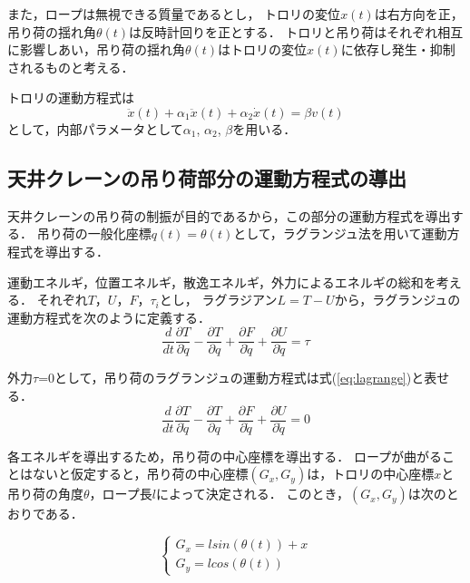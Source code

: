 \documentclass[dvipdfmx,titlepage,a4j]{jsarticle}  %
\begin{document}
また，ロープは無視できる質量であるとし，
トロリの変位$x(t)$は右方向を正，吊り荷の揺れ角$\theta(t)$は反時計回りを正とする．
トロリと吊り荷はそれぞれ相互に影響しあい，吊り荷の揺れ角$\theta(t)$はトロリの変位$x(t)$に依存し発生・抑制されるものと考える．

トロリの運動方程式は
\begin{equation}
  \ddot x(t) + \alpha_1 \ddot x(t)+ \alpha_2 \dot x(t) = \beta v(t) \nonumber
\end{equation}
として，内部パラメータとして$\alpha_1$, $\alpha_2$, $\beta$を用いる．

\subsection{天井クレーンの吊り荷部分の運動方程式の導出}
天井クレーンの吊り荷の制振が目的であるから，この部分の運動方程式を導出する．
吊り荷の一般化座標$q(t) = \theta(t)$として，ラグランジュ法を用いて運動方程式を導出する．

運動エネルギ，位置エネルギ，散逸エネルギ，外力によるエネルギの総和を考える．
それぞれ$T$，$U$，$F$，$\tau_i$とし，
ラグラジアン$L = T - U$から，ラグランジュの運動方程式を次のように定義する．
\begin{equation}
  \frac{d}{dt} \frac{\partial T}{\partial \dot{q}} - \frac{\partial T}{\partial q} + \frac{\partial F}{\partial \dot q} + \frac{\partial U}{\partial \dot q} = \tau \nonumber
\end{equation}

外力$\tau$=0として，吊り荷のラグランジュの運動方程式は式(\ref{eq:lagrange})と表せる．
\begin{equation}
  \frac{d}{dt} \frac{\partial T}{\partial \dot{q}} - \frac{\partial T}{\partial q} + \frac{\partial F}{\partial \dot q} + \frac{\partial U}{\partial \dot q} = 0 \label{eq:lagrange}
\end{equation}

各エネルギを導出するため，吊り荷の中心座標を導出する．
ロープが曲がることはないと仮定すると，吊り荷の中心座標$(G_x, G_y)$は，トロリの中心座標$x$と吊り荷の角度$\theta$，ロープ長$l$によって決定される．
このとき，$(G_x, G_y)$は次のとおりである．

\begin{equation}
  \begin{cases}
    G_x = l sin(\theta(t)) + x \nonumber \\
    G_y = l cos(\theta(t))
  \end{cases}
\end{equation}
\end{document}

